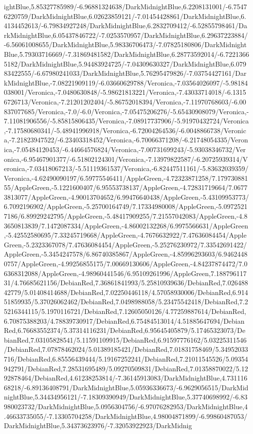 {\begin{tikzternal}
ightBlue,5.85327785989/-6.96881324638/DarkMidnightBlue,6.2208131001/-6.75476220759/DarkMidnightBlue,6.02623859121/-7.01454428861/DarkMidnightBlue,6.4134452613/-6.79834927248/DarkMidnightBlue,6.2832709412/-6.52855798461/DarkMidnightBlue,6.05437846722/-7.0253570957/DarkMidnightBlue,6.29637223884/-6.56061008655/DarkMidnightBlue,5.98336706473/-7.07825180806/DarkMidnightBlue,5.79303716669/-7.31869481582/DarkMidnightBlue,6.28773592014/-6.72213665182/DarkMidnightBlue,5.94483924725/-7.04309630327/DarkMidnightBlue,6.07983422555/-6.67980241033/DarkMidnightBlue,5.76295479826/-7.03754427161/DarkMidnightBlue,-7.08221909119/-6.03660629788/Veronica,-7.03564026097/-5.98184038001/Veronica,-7.0480630848/-5.98621813221/Veronica,-7.43033714018/-6.13156726713/Veronica,-7.21201202404/-5.86752018394/Veronica,-7.11970768603/-6.00837077685/Veronica,-7.0/-6.0/Veronica,-7.05475206276/-5.65430908079/Veronica,-7.11081906556/-5.85815806435/Veronica,-7.08917737906/-5.91970432724/Veronica,-7.17580680341/-5.48941996918/Veronica,-6.72004264536/-6.0048866738/Veronica,-7.21823947522/-6.23403318452/Veronica,-6.70066371208/-6.21748054335/Veronica,-7.05484120453/-6.44664576824/Veronica,-7.00731699243/-5.93038346732/Veronica,-6.95467901377/-6.51802124301/Veronica,-7.13979822587/-6.20725939314/Veronica,-7.03418067213/-5.51119361537/Veronica,-6.82447511161/-5.83632039359/Veronica,-4.62490090197/6.59775546411/AppleGreen,-4.72323871258/7.17973088155/AppleGreen,-5.1221600407/6.95553738137/AppleGreen,-4.72831719664/7.06773813077/AppleGreen,-4.90013704652/6.99476640438/AppleGreen,-5.43109953773/6.7092196902/AppleGreen,-5.25700164749/7.17334980008/AppleGreen,-5.09725217186/6.89929242795/AppleGreen,-5.48417909255/7.21557042083/AppleGreen,-4.83650813839/7.1472087334/AppleGreen,-4.86002132268/6.9975566631/AppleGreen,-5.42552580695/7.33245719668/AppleGreen,-4.7676632922/7.47636084454/AppleGreen,-5.2323367078/7.47636084454/AppleGreen,-5.25276230972/7.33542691422/AppleGreen,-5.3454247578/6.86740385867/AppleGreen,-4.85996293603/6.94624480757/AppleGreen,-4.99256855175/7.00669130606/AppleGreen,-4.84237874472/7.06368312088/AppleGreen,-4.98960441546/6.95109261996/AppleGreen,7.18879611731/4.76685621156/DebianRed,7.36861841993/5.25810939636/DebianRed,7.02648842779/5.01408414688/DebianRed,7.02250446118/4.57058930006/DebianRed,6.91451859935/5.37026062462/DebianRed,7.0498988058/5.23475542418/DebianRed,7.25216344115/5.1970116721/DebianRed,7.12605050126/4.77259887614/DebianRed,6.70875388203/4.78839730917/DebianRed,6.75484513014/4.51885647694/DebianRed,6.76683552374/5.37314116231/DebianRed,6.95645405879/5.17465323073/DebianRed,7.03105828541/5.11591109915/DebianRed,6.91597776162/5.03225311546/DebianRed,7.07878462024/5.01389185421/DebianRed,7.01831758469/5.34952033716/DebianRed,6.85556439444/5.19167252241/DebianRed,7.21011545526/5.09354942791/DebianRed,7.28531695489/5.09270509831/DebianRed,7.01358870022/5.1292878464/DebianRed,4.61238253814/-7.36145913083/DarkMidnightBlue,4.73111668218/-6.89136408791/DarkMidnightBlue,5.05936336673/-6.9629056515/DarkMidnightBlue,5.34434956121/-7.18309390949/DarkMidnightBlue,5.37740698992/-6.83980023732/DarkMidnightBlue,5.0956304756/-6.97076282953/DarkMidnightBlue,4.46633735055/-7.13305704258/DarkMidnightBlue,4.98004871899/-6.99860487053/DarkMidnightBlue,5.34373623976/-7.32053922923/DarkMidnig
\end{tikzternal}}
